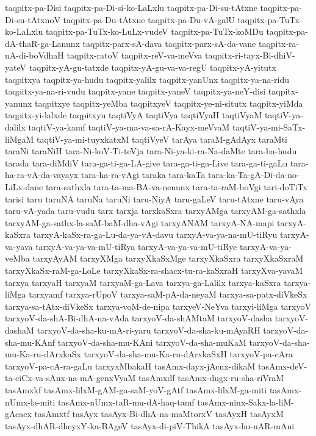 {taqpitx-pa-Disi
taqpitx-pa-Di-si-ko-LaLxlu
taqpitx-pa-Di-su-tAtxne
taqpitx-pa-Di-su-tAtxnoV
taqpitx-pa-Du-tAtxne
taqpitx-pa-Du-vA-galU
taqpitx-pa-TuTx-ko-LaLxlu
taqpitx-pa-TuTx-ko-LuLx-vudeV
taqpitx-pa-TuTx-koMDu
taqpitx-pa-dA-thaR-ga-Lanunx
taqpitx-parx-sA-dava
taqpitx-parx-sA-da-vane
taqpitx-ra-nA-di-boVdhaH
taqpitx-ratoV
taqpitx-reV-va-meVva
taqpitx-ri-tayx-Bi-dhiV-yateV
taqpitx-yA-gu-tatxde
taqpitx-yA-gu-va-va-regU
taqpitx-yA-yitutx
taqpitxya
taqpitx-ya-hudu
taqpitx-yalilx
taqpitx-yanUnx
taqpitx-ya-na-ridu
taqpitx-ya-na-ri-vudu
taqpitx-yane
taqpitx-yaneV
taqpitx-ya-neY-disi
taqpitx-yanunx
taqpitxye
taqpitx-yeMba
taqpitxyeV
taqpitx-ye-ni-situtx
taqpitx-yiMda
taqpitx-yi-lalxde
taqpitxyu
taqtiVyA
taqtiVya
taqtiVyaH
taqtiVyaM
taqtiV-ya-dalilx
taqtiV-ya-kamf
taqtiV-ya-ma-va-sa-rA-Kayx-meVvaM
taqtiV-ya-mi-SaTx-liMgaM
taqtiV-ya-mi-tuyxkatxM
taqtiVyeV
tarAya
taraM-gAdAyx
taraMti
taraNi
taraNiH
tara-Ni-koV-Ti-teVja
tara-Ni-ya-ki-ra-Na-daMte
tara-ba-hudu
tarada
tara-diMdiV
tara-ga-ti-ga-LA-give
tara-ga-ti-ga-Live
tara-ga-ti-gaLu
tara-ha-ra-vA-da-vayayx
tara-ha-ra-vAgi
taraka
tara-kaTa
tara-ka-Ta-gA-Di-da-no-LiLx-dane
tara-sathxla
tara-ta-ma-BA-va-nenunx
tara-ta-raM-boVgi
tari-doTiTx
tarisi
taru
taruNA
taruNa
taruNi
taru-NiyA
taru-gaLeV
taru-tAtxne
taru-vAya
taru-vA-yada
taru-vudu
tarx
tarxja
tarxkaSxra
tarxyAMga
tarxyAM-ga-sathxla
tarxyAM-ga-sathx-la-saM-baM-dha-vAgi
tarxyANAM
tarxyA-NA-mapi
tarxyA-kaSxra
tarxyA-kaSx-ra-ga-Lu-da-ya-vA-davu
tarxyA-va-ya-na-mU-tiRyu
tarxyA-va-yava
tarxyA-va-ya-va-mU-tiRya
tarxyA-va-ya-va-mU-tiRye
tarxyA-va-ya-veMba
tarxyAyAM
tarxyXMga
tarxyXkaSxMge
tarxyXkaSxra
tarxyXkaSxraM
tarxyXkaSx-raM-ga-LoLe
tarxyXkaSx-ra-shacx-tu-ra-kaSxraH
tarxyXva-yavaM
tarxya
tarxyaH
tarxyaM
tarxyaM-ga-Lava
tarxya-ga-Lalilx
tarxya-kaSxra
tarxya-liMga
tarxyamf
tarxya-rUpoV
tarxya-saM-pA-da-neyaM
tarxya-sa-patx-diVkeSx
tarxya-sa-tAtx-diVkeSx
tarxya-voM-de-nipa
tarxyeV-NeYva
tarxyi-liMga
tarxyoV
tarxyoV-da-shA-Bi-dhA-na-vAda
tarxyoV-da-shAMtaM
tarxyoV-dasha
tarxyoV-dashaM
tarxyoV-da-sha-ku-mA-ri-yaru
tarxyoV-da-sha-ku-mAyaRH
tarxyoV-da-sha-mu-KAnf
tarxyoV-da-sha-mu-KAni
tarxyoV-da-sha-muKaM
tarxyoV-da-sha-mu-Ka-ru-dArxkaSx
tarxyoV-da-sha-mu-Ka-ru-dArxkaSxH
tarxyoV-pa-cAra
tarxyoV-pa-cA-ra-gaLu
tarxyxMbakaH
tasAmx-dayx-jAcnx-dikaM
tasAmx-deV-ta-ciCx-va-sAnx-na-mA-genxVyaM
tasAmxdf
tasAmx-dugx-ru-sha-riVraM
tasAmxkf
tasAmx-lilxM-gAM-ga-saM-yoV-gAtf
tasAmx-lilxM-ga-miti
tasAmx-nUmx-la-miti
tasAmx-nUmx-taR-mu-dA-haq-tamf
tasAmx-ninx-Sakx-la-liM-gAcacx
tasAmxtf
tasAyx
tasAyx-Bi-dhA-na-maMtorxV
tasAyxH
tasAyxM
tasAyx-dhAR-dheyxY-ka-BAgeV
tasAyx-di-piV-ThikA
tasAyx-hu-nAR-mAni
}
